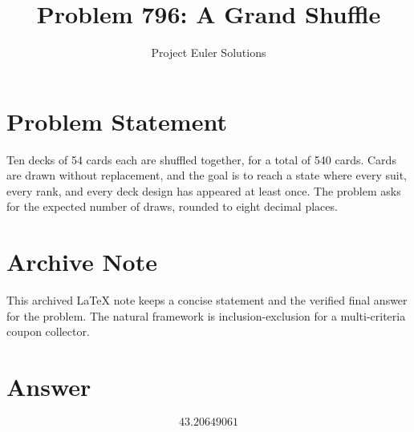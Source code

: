 \documentclass[11pt]{article}
\title{Problem 796: A Grand Shuffle}
\author{Project Euler Solutions}
\date{}
\begin{document}
\maketitle

\section{Problem Statement}
Ten decks of 54 cards each are shuffled together, for a total of 540 cards. Cards are drawn without replacement, and the goal is to reach a state where every suit, every rank, and every deck design has appeared at least once. The problem asks for the expected number of draws, rounded to eight decimal places.

\section{Archive Note}
This archived LaTeX note keeps a concise statement and the verified final answer for the problem. The natural framework is inclusion-exclusion for a multi-criteria coupon collector.

\section{Answer}

\[
\boxed{43.20649061}
\]
\end{document}
